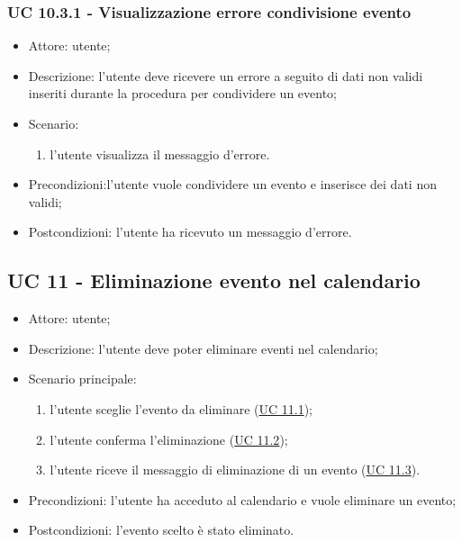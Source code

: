 \subsubsection{UC 10.3.1 - Visualizzazione errore condivisione evento} \label{sec: UC 10.3.1}
\begin{itemize}
    \item Attore: utente;
    \item Descrizione: l'utente deve ricevere un errore a seguito di dati non validi inseriti durante la procedura per condividere un evento;
    \item Scenario:
        \begin{enumerate}
        \item l'utente visualizza il messaggio d'errore.
        \end{enumerate}
    
    \item Precondizioni:l'utente vuole condividere un evento e inserisce dei dati non validi;
    \item Postcondizioni: l'utente ha ricevuto un messaggio d'errore.
\end{itemize}


\subsection{UC 11 - Eliminazione evento nel calendario}
\begin{itemize}
    \item Attore: utente;
    \item Descrizione: l'utente deve poter eliminare eventi nel calendario;
    \item Scenario principale:
        \begin{enumerate}
        \item l'utente sceglie l'evento da eliminare (\hyperref[sec: UC 11.1]{UC 11.1});
        \item l'utente conferma l'eliminazione (\hyperref[sec: UC 11.2]{UC 11.2});
        \item l'utente riceve il messaggio di eliminazione di un evento (\hyperref[sec: UC 11.3]{UC 11.3}).
        \end{enumerate}
    \item Precondizioni: l'utente ha acceduto al calendario e vuole eliminare un evento;
    \item Postcondizioni: l'evento scelto è stato eliminato.
\end{itemize}


